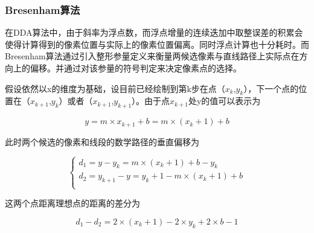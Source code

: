 \documentclass[a4paper,UTF8]{article}
\theoremstyle{definition}
\begin{document}
\subsubsection{Bresenham算法}
在DDA算法中，由于斜率为浮点数，而浮点增量的连续迭加中取整误差的积累会使得计算得到的像素位置与实际上的像素位置偏离。同时浮点计算也十分耗时。而Bresenham算法通过引入整形参量定义来衡量两候选像素与直线路径上实际点在方向上的偏移。并通过对该参量的符号判定来决定像素点的选择。
\par 假设依然以x的维度为基础，设目前已经绘制到第k步在点（$x_{k}$,$y_{k}$），下一个点的位置在（$x_{k+1}$,$y_{k}$）或者（$x_{k+1}$,$y_{k+1}$）。由于点$x_{k+1}$处y的值可以表示为

\begin{equation}
y = m \times x_{k+1} + b =m \times (x_{k}+1)+b
\end{equation}

\par 此时两个候选的像素和线段的数学路径的垂直偏移为

\begin{equation}
\left\{
\begin{aligned}
d_{1}=y-y_{k}=m \times (x_{k}+1)+b-y_{k}\\
d_{2}=y_{k+1}-y=y_{k}+1-m \times (x_{k}+1)+b\\
\end{aligned}
\right.
\end{equation}
\par 这两个点距离理想点的距离的差分为

\begin{equation}
d_{1}-d_{2}=2 \times (x_{k}+1)-2 \times y_{k}+2 \times b -1
\end{equation}
\end{document}

